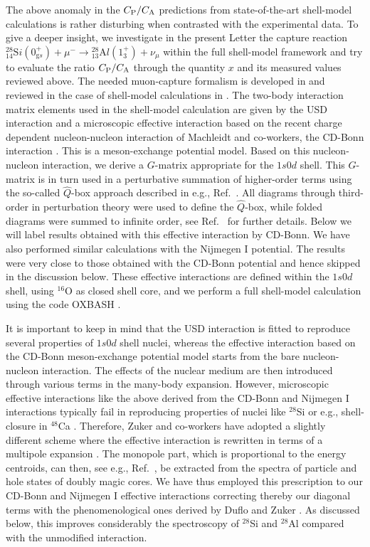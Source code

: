 \begin{multicols}{2}
The above anomaly in the $C_{\rm P}/C_{\rm A}$ predictions from
state-of-the-art shell-model calculations is rather disturbing when
contrasted with the experimental data. To give a deeper insight, we investigate
in the present Letter the capture reaction
${}^{28}_{14}{\mathrm Si}(0^+_{\mathrm gs})+\mu^-
\rightarrow{}^{28}_{13}{\mathrm Al}(1^+_3)+\nu_\mu$ within
the full shell-model framework and try to evaluate
the ratio $C_{\rm P}/C_{\rm A}$ through the quantity $x$ and its measured
values reviewed above. The needed muon-capture formalism is developed
in \cite{mor} and reviewed in the case
of shell-model calculations in \cite{KUZ94,sii}. The two-body interaction
matrix elements used in the shell-model calculation are given by the
USD interaction \cite{wil} and a microscopic effective
interaction based on the recent charge dependent nucleon-nucleon
interaction of Machleidt and co-workers,
the CD-Bonn interaction \cite{mac96}. This is a meson-exchange
potential model. Based on this nucleon-nucleon
interaction, we derive a $G$-matrix appropriate for
the $1s0d$ shell. This $G$-matrix is in turn used in a
perturbative summation of higher-order terms using the
so-called $\hat{Q}$-box approach described in e.g., Ref.\ \cite{hko95}.
All diagrams through third-order in perturbation
theory were used to define the $\hat{Q}$-box, while folded
diagrams were summed to infinite order, see Ref.\  \cite{hko95}
for further details. Below we will label results obtained with this
effective interaction by CD-Bonn. We have also performed similar
calculations with the Nijmegen I \cite{nim94}
potential. The results were very close to those obtained with the CD-Bonn
potential and hence skipped in the discussion below.
These effective interactions
are defined within the
$1s0d$ shell, using $^{16}$O as closed shell core,
and we perform a full shell-model calculation
using the code OXBASH \cite{oxb}.

It is important to keep in mind that the USD
interaction is fitted to reproduce several properties of
$1s0d$ shell nuclei, whereas the effective interaction based on the
CD-Bonn meson-exchange potential model starts from the
bare nucleon-nucleon interaction. The effects of the
nuclear medium are then introduced through various terms
in the many-body expansion. However, microscopic effective interactions
like the above derived from the CD-Bonn and Nijmegen I interactions
typically fail in reproducing properties of nuclei like $^{28}$Si
or e.g., shell-closure in $^{48}$Ca \cite{hko95}.
Therefore, Zuker and co-workers \cite{zuk94,zuk98} have adopted a slightly
different scheme where the effective interaction is
rewritten in terms of a multipole expansion \cite{zuk94}.
The monopole part, which is proportional to the energy centroids,
can then, see e.g., Ref.\
\cite{zuk98}, be extracted from the spectra of particle
and hole states of doubly magic cores. We have thus employed this
prescription to our CD-Bonn and Nijmegen I effective interactions
correcting thereby our diagonal terms with the phenomenological
ones derived by Duflo and Zuker \cite{zuk98}. As discussed below, this
improves considerably the spectroscopy of $^{28}$Si and $^{28}$Al
compared with the unmodified interaction.


\end{multicols}
